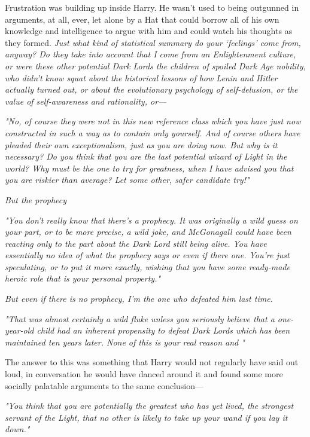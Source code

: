 Frustration was building up inside Harry. He wasn't used to being outgunned in
arguments, at all, ever, let alone by a Hat that could borrow all of his own
knowledge and intelligence to argue with him and could watch his thoughts as
they formed. \emph{Just what kind of statistical summary do your `feelings'
come from, anyway? Do they take into account that I come from an Enlightenment
culture, or were these other potential Dark Lords the children of spoiled Dark
Age nobility, who didn't know squat about the historical lessons of how Lenin
and Hitler actually turned out, or about the evolutionary psychology of
self-delusion, or the value of self-awareness and rationality, or---}

\emph{"No, of course they were not in this new reference class which you have
just now constructed in such a way as to contain only yourself. And of course
others have pleaded their own exceptionalism, just as you are doing now. But
why is it necessary? Do you think that you are the last potential wizard of
Light in the world? Why must  be the one to try for greatness, when I
have advised you that you are riskier than average? Let some other, safer
candidate try!"}

\emph{But the prophecy{\el}}

\emph{"You don't really know that there's a prophecy. It was originally a wild
guess on your part, or to be more precise, a wild joke, and McGonagall could
have been reacting only to the part about the Dark Lord still being
alive. You have essentially no idea of what the prophecy says or even if there
 one. You're just speculating, or to put it more exactly, wishing
that you have some ready-made heroic role that is your personal property."}

\emph{But even if there is no prophecy, I'm the one who defeated him last time.}

\emph{"That was almost certainly a wild fluke unless you seriously believe that
a one-year-old child had an inherent propensity to defeat Dark Lords which has
been maintained ten years later. None of this is your real reason and "}

The answer to this was something that Harry would not regularly have said out
loud, in conversation he would have danced around it and found some more
socially palatable arguments to the same conclusion\mbox{---}

\emph{"You think that you are potentially the greatest who has yet lived, the
strongest servant of the Light, that no other is likely to take up your wand if
you lay it down."}

